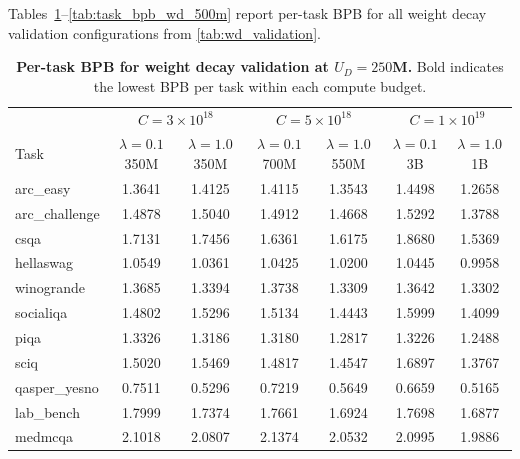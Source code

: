 Tables~\ref{tab:task_bpb_wd_250m}--\ref{tab:task_bpb_wd_500m} report per-task BPB for all weight decay validation configurations from \autoref{tab:wd_validation}.

\begin{table}[t]
    \centering
    \caption{\textbf{Per-task BPB for weight decay validation at $U_D = 250$M.} Bold indicates the lowest BPB per task within each compute budget.}
    \label{tab:task_bpb_wd_250m}
    \footnotesize
    \begin{tabular}{l cc cc cc}
        \toprule
        & \multicolumn{2}{c}{$C = 3 \times 10^{18}$} & \multicolumn{2}{c}{$C = 5 \times 10^{18}$} & \multicolumn{2}{c}{$C = 1 \times 10^{19}$} \\
        \cmidrule(lr){2-3} \cmidrule(lr){4-5} \cmidrule(lr){6-7}
        Task & \makecell{$\lambda\!=\!0.1$\\350M} & \makecell{$\lambda\!=\!1.0$\\350M} & \makecell{$\lambda\!=\!0.1$\\700M} & \makecell{$\lambda\!=\!1.0$\\550M} & \makecell{$\lambda\!=\!0.1$\\3B} & \makecell{$\lambda\!=\!1.0$\\1B} \\
        \midrule
        arc\_easy & {1.3641} & 1.4125 & 1.4115 & {1.3543} & 1.4498 & {1.2658} \\
        arc\_challenge & {1.4878} & 1.5040 & 1.4912 & {1.4668} & 1.5292 & {1.3788} \\
        csqa & {1.7131} & 1.7456 & 1.6361 & {1.6175} & 1.8680 & {1.5369} \\
        hellaswag & 1.0549 & {1.0361} & 1.0425 & {1.0200} & 1.0445 & {0.9958} \\
        winogrande & 1.3685 & {1.3394} & 1.3738 & {1.3309} & 1.3642 & {1.3302} \\
        socialiqa & {1.4802} & 1.5296 & 1.5134 & {1.4443} & 1.5999 & {1.4099} \\
        piqa & 1.3326 & {1.3186} & 1.3180 & {1.2817} & 1.3226 & {1.2488} \\
        sciq & {1.5020} & 1.5469 & 1.4817 & {1.4547} & 1.6897 & {1.3767} \\
        qasper\_yesno & 0.7511 & {0.5296} & 0.7219 & {0.5649} & 0.6659 & {0.5165} \\
        lab\_bench & 1.7999 & {1.7374} & 1.7661 & {1.6924} & 1.7698 & {1.6877} \\
        medmcqa & 2.1018 & {2.0807} & 2.1374 & {2.0532} & 2.0995 & {1.9886} \\

\end{tabular}
\end{table}

